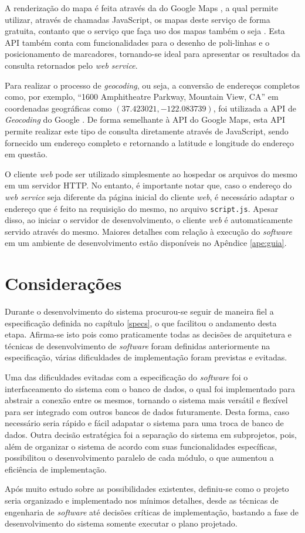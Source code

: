 A renderização do mapa é feita através da  do Google Maps \cite{gmapsapi}, a qual permite utilizar, através de chamadas JavaScript, os mapas deste serviço de forma gratuita, contanto que o serviço que faça uso dos mapas também o seja \cite{gmapsterms}.
Esta API também conta com funcionalidades para o desenho de poli-linhas e o posicionamento de marcadores, tornando-se ideal para apresentar os resultados da consulta retornados pelo \emph{web service}.

Para realizar o processo de \emph{geocoding}, ou seja, a conversão de endereços completos como, por exemplo, ``1600 Amphitheatre Parkway, Mountain View, CA'' em coordenadas geográficas como $(37.423021, -122.083739)$, foi utilizada a API de \emph{Geocoding} do Google \cite{geocodingapi}.
De forma semelhante à API do Google Maps, esta API permite realizar este tipo de consulta diretamente através de JavaScript, sendo fornecido um endereço completo e retornando a latitude e longitude do endereço em questão.

O cliente \emph{web} pode ser utilizado simplesmente ao hospedar os arquivos do mesmo em um servidor HTTP.
No entanto, é importante notar que, caso o endereço do \emph{web service} seja diferente da página inicial do cliente \emph{web}, é necessário adaptar o endereço que é feito na requisição do mesmo, no arquivo \texttt{script.js}.
Apesar disso, ao iniciar o servidor de desenvolvimento, o cliente \emph{web} é automaticamente servido através do mesmo.
Maiores detalhes com relação à execução do \emph{software} em um ambiente de desenvolvimento estão disponíveis no Apêndice \ref{ape:guia}.

\section{Considerações}
Durante o desenvolvimento do sistema procurou-se seguir de maneira fiel a especificação definida no capítulo \ref{specs}, o que facilitou o andamento desta etapa. Afirma-se isto pois como praticamente todas as decisões de arquitetura e técnicas de desenvolvimento de \emph{software} foram definidas anteriormente na especificação, várias dificuldades de implementação foram previstas e evitadas. 

Uma das dificuldades evitadas com a especificação do \emph{software} foi o interfaceamento do sistema com o banco de dados, o qual foi implementado para abstrair a conexão entre os mesmos, tornando o sistema mais versátil e flexível para ser integrado com outros bancos de dados futuramente.
Desta forma, caso necessário seria rápido e fácil adapatar o sistema para uma troca de banco de dados.
Outra decisão estratégica foi a separação do sistema em subprojetos, pois, além de organizar o sistema de acordo com suas funcionalidades específicas, possibilitou o desenvolvimento paralelo de cada módulo, o que aumentou a eficiência de implementação.

Após muito estudo sobre as possibilidades existentes, definiu-se como o projeto seria organizado e implementado nos mínimos detalhes, desde as técnicas de engenharia de \emph{software} até decisões críticas de implementação, bastando a fase de desenvolvimento do sistema somente executar o plano projetado.

